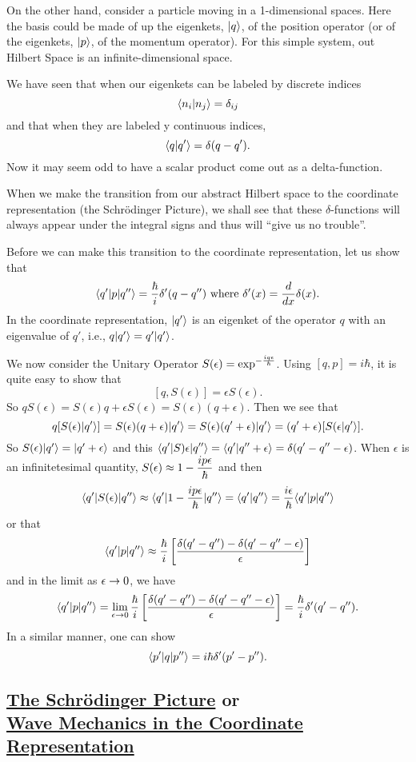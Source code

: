 On the other hand, consider a particle moving in a 1-dimensional spaces. Here the basis could be made of up the eigenkets, $|q\rangle$, of the position operator (or of the eigenkets, $|p\rangle$, of the momentum operator). For this 
simple system, out Hilbert Space is an infinite-dimensional space. 

We have seen that when our eigenkets can be labeled by discrete indices 
$$\langle n_i|n_j\rangle = \delta_{ij}$$ and that when they are labeled y continuous indices, 
$$\langle q|q'\rangle = \delta(q-q').$$
Now it may seem odd to have a scalar product come out as a delta-function.

When we make the transition from our abstract Hilbert space to the coordinate representation (the Schr\"odinger Picture), we shall see that these $\delta$-functions will always appear under the integral signs and thus
will ``give us no trouble''.

Before we can make this transition to the coordinate representation, let us show that 
$$\langle q'| p| q'' \rangle = {\hbar\over i} \delta'(q-q'') \mbox{ where } \delta'(x) = {d\over dx}\delta(x).$$
In the coordinate representation, $|q'\rangle$ is an eigenket of the operator $q$ with an eigenvalue of $q'$, i.e., $q|q'\rangle = q'|q'\rangle$. 

We now consider the Unitary Operator $\displaystyle S(\epsilon) = \exp^{-{iq\epsilon\over\hbar}}$. Using $[q,p] = i\hbar$, it is quite easy to show that 
$$[q,S(\epsilon)] = \epsilon S(\epsilon).$$ 
So $qS(\epsilon) = S(\epsilon) q + \epsilon S(\epsilon) = S(\epsilon)(q + \epsilon)$. Then we see that 
$$q[S(\epsilon)|q'\rangle] = S(\epsilon)(q+\epsilon)|q'\rangle = S(\epsilon)(q' + \epsilon)|q'\rangle = (q' + \epsilon)[S(\epsilon|q'\rangle].$$
So $S(\epsilon)|q'\rangle = |q'+ \epsilon\rangle$ and this $\displaystyle \langle q'| S)\epsilon| q'' \rangle = \langle q'|q''+\epsilon\rangle = \delta(q'-q''-\epsilon)$. 
When $\epsilon$ is an infinitetesimal quantity, $\displaystyle S(\epsilon) \approx 1 - {i p\epsilon\over \hbar}$ and then 
$$ \langle q'| S(\epsilon)| q'' \rangle \approx \langle q'| 1 - {i p\epsilon\over \hbar}| q'' \rangle = \langle q'|q''\rangle =  {i \epsilon\over \hbar}\langle q'| p| q'' \rangle$$ 
or that 
$$\langle q'| p| q'' \rangle \approx {\hbar\over i} \left[ {\delta(q'-q'') - \delta(q'-q''-\epsilon)\over \epsilon}\right]$$ and in the limit as $\epsilon\rightarrow 0$, we have 
$$\langle q'| p| q'' \rangle = \lim_{\epsilon\rightarrow 0} {\hbar\over i} \left[ {\delta(q'-q'') - \delta(q'-q''-\epsilon)\over \epsilon}\right] = {\hbar\over i} \delta'(q'-q'').$$
In a similar manner, one can show
$$\langle p'| q| p'' \rangle = i\hbar \delta'(p'-p'').$$
 
\subsection{\underline{The Schr\"odinger Picture} or \\ \underline{Wave Mechanics in the Coordinate Representation}}












